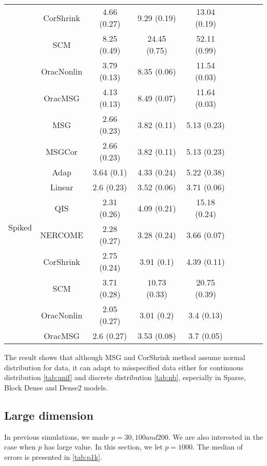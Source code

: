 \documentclass[useAMS,referee,usenatbib]{biom}
\begin{document}
\begin{table}[H]
{\begin{tabular}{ccccccccc}
 & CorShrink      & 4.66 (0.27) & 9.29 (0.19)  & 13.04 (0.19) \\
 & SCM            & 8.25 (0.49) & 24.45 (0.75) & 52.11 (0.99) \\
 & OracNonlin & 3.79 (0.13) & 8.35 (0.06)  & 11.54 (0.03) \\
 & OracMSG  & 4.13 (0.13) & 8.49 (0.07)  & 11.64 (0.03) \\  \midrule
\multirow{10}{*}{Spiked}  
  & MSG & 2.66 (0.23) & 3.82 (0.11)  & 5.13 (0.23)  \\
 & MSGCor   & 2.66 (0.23) & 3.82 (0.11)  & 5.13 (0.23)  \\
 & Adap     & 3.64 (0.1)  & 4.33 (0.24)  & 5.22 (0.38)  \\
 & Linear         & 2.6 (0.23)  & 3.52 (0.06)  & 3.71 (0.06)  \\
 & QIS            & 2.31 (0.26) & 4.09 (0.21)  & 15.18 (0.24) \\
 & NERCOME        & 2.28 (0.27) & 3.28 (0.24)  & 3.66 (0.07)  \\
 & CorShrink      & 2.75 (0.24) & 3.91 (0.1)   & 4.39 (0.11)  \\
 & SCM            & 3.71 (0.28) & 10.73 (0.33) & 20.75 (0.39) \\
 & OracNonlin & 2.05 (0.27) & 3.01 (0.2)   & 3.4 (0.13)   \\
 & OracMSG  & 2.6 (0.27)  & 3.53 (0.08)  & 3.7 (0.05)  \\ \bottomrule
\end{tabular}%
}
\end{table}
The result shows that although MSG and CorShrink method assume normal distribution for data, it can adapt to misspecified data either for continuous distribution \ref{tab:unif} and discrete distribution \ref{tab:nb}, especially in Sparse, Block Dense and Dense2 models.

\subsection{Large dimension}
In previous simulations, we made $p=30,100 and 200$. We are also interested in the case when $p$ has large value. In this section, we let $p=1000$. The median of errors is presented in \ref{tab:p1k}. 
\end{document}
